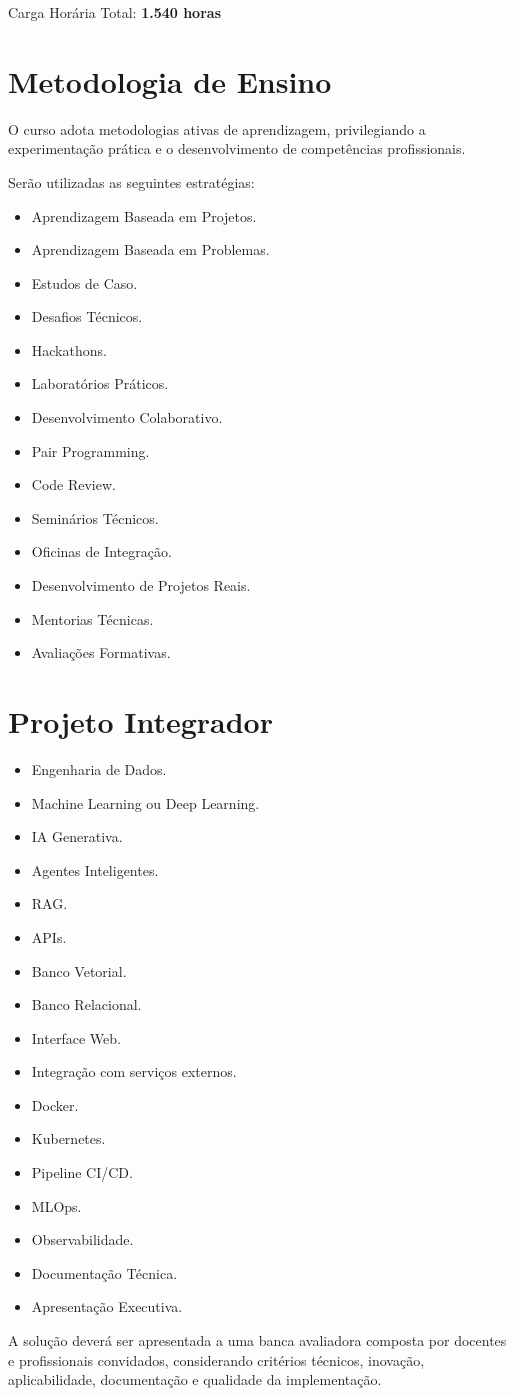 Carga Horária Total: \textbf{1.540 horas}

\section{Metodologia de Ensino}
O curso adota metodologias ativas de aprendizagem, privilegiando a experimentação prática e o desenvolvimento de competências profissionais.

Serão utilizadas as seguintes estratégias:
\begin{itemize}
    \item Aprendizagem Baseada em Projetos.
    \item Aprendizagem Baseada em Problemas.
    \item Estudos de Caso.
    \item Desafios Técnicos.
    \item Hackathons.
    \item Laboratórios Práticos.
    \item Desenvolvimento Colaborativo.
    \item Pair Programming.
    \item Code Review.
    \item Seminários Técnicos.
    \item Oficinas de Integração.
    \item Desenvolvimento de Projetos Reais.
    \item Mentorias Técnicas.
    \item Avaliações Formativas.
\end{itemize}

\section{Projeto Integrador}

\begin{itemize}
    \item Engenharia de Dados.
    \item Machine Learning ou Deep Learning.
    \item IA Generativa.
    \item Agentes Inteligentes.
    \item RAG.
    \item APIs.
    \item Banco Vetorial.
    \item Banco Relacional.
    \item Interface Web.
    \item Integração com serviços externos.
    \item Docker.
    \item Kubernetes.
    \item Pipeline CI/CD.
    \item MLOps.
    \item Observabilidade.
    \item Documentação Técnica.
    \item Apresentação Executiva.
\end{itemize}

A solução deverá ser apresentada a uma banca avaliadora composta por docentes e profissionais convidados, considerando critérios técnicos, inovação, aplicabilidade, documentação e qualidade da implementação.
